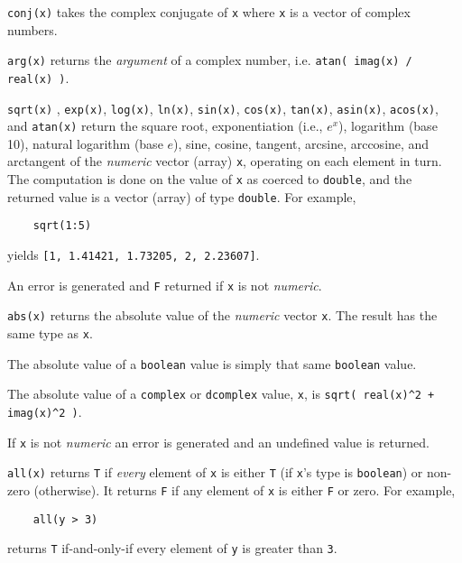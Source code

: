 \begin{sloppy}
\begin{list}{}{}
\item[{\tt conj(x)}] \label{conj-func} 
takes the complex conjugate of {\tt x} where {\tt x} is a vector
of complex numbers.

\item[{\tt arg(x)}] \label{arg-func} 
returns the {\em argument} of a complex number, i.e. 
\verb-atan( imag(x) / real(x) )-.

\item[{\tt sqrt(x)}], {\tt exp(x)}, {\tt log(x)}, {\tt ln(x)}, {\tt sin(x)},
{\tt cos(x)}, {\tt tan(x)}, {\tt asin(x)}, {\tt acos(x)}, and {\tt atan(x)}
\label{sqrt-func} \label{exp-func} \label{log-func}
\label{ln-func} \label{sin-func} \label{cos-func}
\label{tan-func} \label{asin-func} \label{acos-func}
\label{atan-func}
return the square root, exponentiation (i.e., $e^x$),
logarithm (base 10), natural logarithm (base $e$), sine, cosine, tangent,
arcsine, arccosine, and arctangent of the {\em numeric} vector (array) {\tt x},
operating on each element in turn.  The computation is done on the value of
{\tt x} as coerced to {\tt double}, and the returned value is a vector (array)
of type {\tt double}.  For example,
\begin{verbatim}
    sqrt(1:5)
\end{verbatim}
yields {\tt [1, 1.41421, 1.73205, 2, 2.23607]}.

An error is generated and {\tt F} returned if {\tt x} is not {\em numeric\/}.

\item[{\tt abs(x)}] \label{abs-func} 
returns the absolute value of the {\em numeric} vector
{\tt x}.  The result has the same type as {\tt x}.

The absolute value of a {\tt boolean} value is simply that same {\tt boolean}
value.

The absolute value of a {\tt complex} or {\tt dcomplex} value, {\tt x}, is
\verb-sqrt( real(x)^2 + imag(x)^2 )-.

If {\tt x} is not {\em numeric\/} an error is generated and
an undefined value is returned.

\item[{\tt all(x)}] \label{all-func} 
returns {\tt T} if {\em every} element of {\tt x} is
either {\tt T} (if {\tt x}'s type is {\tt boolean}) or non-zero (otherwise).
It returns {\tt F} if any element of {\tt x} is either {\tt F} or zero.
For example,
\begin{verbatim}
    all(y > 3)
\end{verbatim}
returns {\tt T} if-and-only-if every element of {\tt y} is greater than {\tt 3}.


\end{list}
\end{sloppy}
